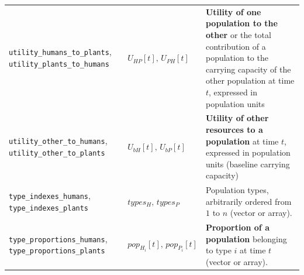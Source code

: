 \documentclass[
]{book}
\begin{document}
\begin{longtable}[]{@{}lll@{}}
\begin{minipage}[t]{0.36\columnwidth}\raggedright
\texttt{utility\_humans\_to\_plants}, \texttt{utility\_plants\_to\_humans}\strut
\end{minipage} & \begin{minipage}[t]{0.21\columnwidth}\raggedright
\(U_{HP}[t],\,U_{PH}[t]\)\strut
\end{minipage} & \begin{minipage}[t]{0.34\columnwidth}\raggedright
\textbf{Utility of one population to the other} or the total contribution of a population to the carrying capacity of the other population at time \(t\), expressed in population units\strut
\end{minipage}\tabularnewline
\begin{minipage}[t]{0.36\columnwidth}\raggedright
\texttt{utility\_other\_to\_humans}, \texttt{utility\_other\_to\_plants}\strut
\end{minipage} & \begin{minipage}[t]{0.21\columnwidth}\raggedright
\(U_{bH}[t],\,U_{bP}[t]\)\strut
\end{minipage} & \begin{minipage}[t]{0.34\columnwidth}\raggedright
\textbf{Utility of other resources to a population} at time \(t\), expressed in population units (baseline carrying capacity)\strut
\end{minipage}\tabularnewline
\begin{minipage}[t]{0.36\columnwidth}\raggedright
\texttt{type\_indexes\_humans}, \texttt{type\_indexes\_plants}\strut
\end{minipage} & \begin{minipage}[t]{0.21\columnwidth}\raggedright
\(types_{H},\,types_{P}\)\strut
\end{minipage} & \begin{minipage}[t]{0.34\columnwidth}\raggedright
Population types, arbitrarily ordered from \(1\) to \(n\) (vector or array).\strut
\end{minipage}\tabularnewline
\begin{minipage}[t]{0.36\columnwidth}\raggedright
\texttt{type\_proportions\_humans}, \texttt{type\_proportions\_plants}\strut
\end{minipage} & \begin{minipage}[t]{0.21\columnwidth}\raggedright
\(pop_{H_{i}}[t],\,pop_{P_{i}}[t]\)\strut
\end{minipage} & \begin{minipage}[t]{0.34\columnwidth}\raggedright
\textbf{Proportion of a population} belonging to type \(i\) at time \(t\) (vector or array).\strut

\end{minipage}
\end{longtable}
\end{document}
